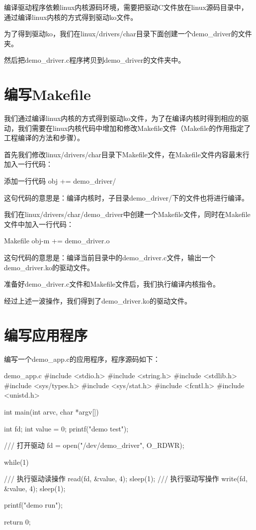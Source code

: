 \documentclass[lang=cn,newtx,10pt,scheme=chinese]{elegantbook}
\begin{document}
编译驱动程序依赖linux内核源码环境，需要把驱动C文件放在linux源码目录中，通过编译linux内核的方式得到驱动ko文件。

为了得到驱动ko，我们在linux/drivers/char目录下面创建一个demo\_driver的文件夹。

然后把demo\_driver.c程序拷贝到demo\_driver的文件夹中。

\section{编写Makefile}

我们通过编译linux内核的方式得到驱动ko文件，为了在编译内核时得到相应的驱动，我们需要在linux内核代码中增加和修改Makefile文件（Makefile的作用指定了工程编译的方法和步骤）。

首先我们修改linux/drivers/char目录下Makefile文件，在Makefile文件内容最末行加入一行代码：

\begin{mycode}{添加一行代码}
obj += demo_driver/
\end{mycode}

这句代码的意思是：编译内核时，子目录demo\_driver/下的文件也将进行编译。

我们在linux/drivers/char/demo\_driver中创建一个Makefile文件，同时在Makefile文件中加入一行代码：

\begin{mycode}{Makefile}
obj-m += demo_driver.o
\end{mycode}

这句代码的意思是：编译当前目录中的demo\_driver.c文件，输出一个demo\_driver.ko的驱动文件。

准备好demo\_driver.c文件和Makefile文件后，我们执行编译内核指令。

经过上述一波操作，我们得到了demo\_driver.ko的驱动文件。

\section{编写应用程序}

编写一个demo\_app.c的应用程序，程序源码如下：

\begin{mycode}{demo\_app.c}
#include <stdio.h> 
#include <string.h> 
#include <stdlib.h>
#include <sys/types.h>
#include <sys/stat.h> 
#include <fcntl.h> 
#include <unistd.h>

int main(int arvc, char *argv[])
{
    int fd;
    int value = 0;
    printf("demo test\n");

    /// 打开驱动
    fd = open("/dev/demo_driver", O_RDWR);

    while(1)
    {
        /// 执行驱动读操作
        read(fd, &value, 4);
        sleep(1);
        /// 执行驱动写操作
        write(fd, &value, 4);
        sleep(1);    
        
        printf("demo run\n");
    }
    return 0;
}
\end{mycode}
\end{document}
